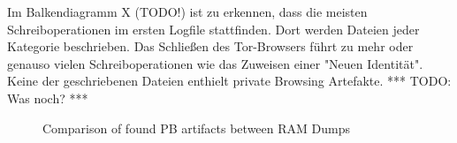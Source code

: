Im Balkendiagramm X (TODO!) ist zu erkennen, dass die meisten Schreiboperationen im ersten Logfile stattfinden. Dort werden Dateien jeder Kategorie beschrieben. Das Schließen des Tor-Browsers führt zu mehr oder genauso vielen Schreiboperationen wie das Zuweisen einer "Neuen Identität". Keine der geschriebenen Dateien enthielt private Browsing Artefakte.
*** TODO: Was noch? ***
	\begin{figure}[h!]
		\centerline{}
		\label{chart:final-criteria}  
		\caption{Comparison of found PB artifacts between RAM Dumps}
	\end{figure}


